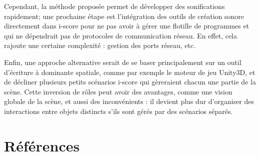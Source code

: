 \documentclass{article}
\begin{document}
    Cependant, la méthode proposée permet de développer des sonifications rapidement; une prochaine étape est l'intégration des outils de création sonore directement dans i-score pour ne pas avoir à gérer une flotille de programmes et qui ne dépendrait pas de protocoles de communication réseau. En effet, cela rajoute une certaine complexité : gestion des ports réseau, etc.
    
    Enfin, une approche alternative serait de se baser principalement sur un outil d'écriture à dominante spatiale, comme par exemple le moteur de jeu Unity3D, et de décliner plusieurs petits scénarios i-score qui gèreraient chacun une partie de la scène. 
    Cette inversion de rôles peut avoir des avantages, comme une vision globale de la scène, et aussi des inconvénients : il devient plus dur d'organiser des interactions entre objets distincts s'ils sont gérés par des scénarios séparés.
    
    \section*{Références}
    
    
    \newpage{}
    
    
\end{document}
